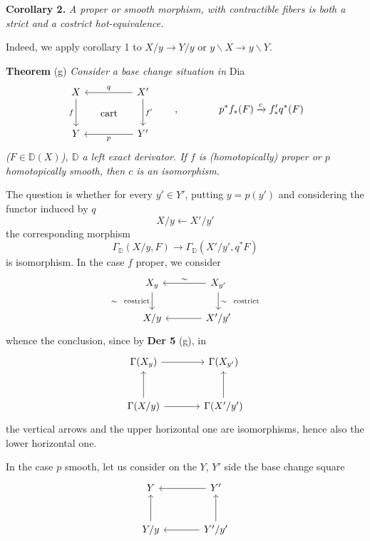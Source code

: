 \documentclass[11pt]{article}
\newcommand{\printedpage}[1]{\marginpar{\footnotesize p.~#1}}
\newcommand{\msp}[1]{\marginpar{\footnotesize [#1]}}
\newcommand{\DD}{\mathbb{D}}
\begin{document}
\noindent\textbf{Corollary 2.} \textit{A proper or smooth morphism, with contractible fibers is both a strict and a costrict hot-equivalence.}

Indeed, we apply corollary 1 to $X/y \to Y/y$ or $y\backslash X \to y\backslash Y$.

\noindent\textbf{Theorem} (g) \textit{Consider a base change situation in} \textsf{Dia}
\[
\begin{tikzcd}[row sep=large, column sep=huge]
X \arrow[d, "f"'] \arrow[dr, phantom, "\text{cart}"] & X' \arrow[l, "q"'] \arrow[d, "f'"] \\
Y & Y' \arrow[l, "p"]
\end{tikzcd}
\qquad , \qquad\qquad p^*f_*(F) \xrightarrow{c} f'_*q^*(F)
\]
\textit{($F \in \DD(X)$), $\DD$ a left exact derivator. If $f$ is (homotopically) proper or $p$ homotopically smooth, then $c$ is an isomorphism.}

\noindent\msp{page 57}
The question is whether for every $y' \in Y'$, putting $y = p(y')$ and considering the functor induced by $q$
\[
X/y \longleftarrow X'/y'
\]
the corresponding morphism
\[
\Gamma_{\DD}(X/y, F) \longrightarrow \Gamma_{\DD}(X'/y', q^*F)
\]
is isomorphism. In the case $f$ proper, we consider
\[
\begin{tikzcd}[column sep=large]
X_y \arrow[d, "\sim\ \ \text{costrict}"'] & X_{y'} \arrow[l, "\sim"'] \arrow[d, "\sim\ \ \text{costrict}"] \\
X/y & X'/y' \arrow[l]
\end{tikzcd}
\]
whence the conclusion, since by \textbf{Der 5} (g), in
\[
\begin{tikzcd}[row sep=large, column sep=large]
\Gamma(X_y) \arrow[r] & \Gamma(X_{y'}) \\
\Gamma(X/y) \arrow[u] \arrow[r] & \Gamma(X'/y') \arrow[u]
\end{tikzcd}
\]
the vertical arrows and the upper horizontal one are isomorphisms, hence also the lower horizontal one.

\printedpage{33}

In the case $p$ smooth, let us consider on the $Y$, $Y'$ side the base change square %
\[
\begin{tikzcd}[row sep=large, column sep=large]
Y & Y' \arrow[l] \\
Y/y \arrow[u] & Y'/y' \arrow[l] \arrow[u]
\end{tikzcd}
\]
\end{document}
